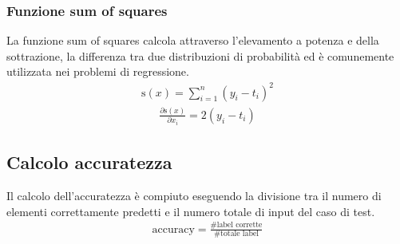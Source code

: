 \subsubsection{Funzione sum of squares}
La funzione sum of squares calcola attraverso l'elevamento a potenza e della sottrazione, la differenza tra due distribuzioni di probabilità ed è comunemente utilizzata nei problemi di regressione.
\begin{align*}
\text{s}(x) = \sum_{i=1}^{n} (y_i - t_i)^2
\end{align*}
\begin{align*}
\frac{\partial \text{s}(x)}{\partial x_i} = 2 (y_i - t_i)
\end{align*}

\subsection{Calcolo accuratezza}
Il calcolo dell'accuratezza è compiuto eseguendo la divisione tra il numero di elementi correttamente predetti e il numero totale di input del caso di test.
\begin{align*}
\text{accuracy} = \frac{\text{\# label corrette}}{\text{\# totale label}}
\end{align*}

